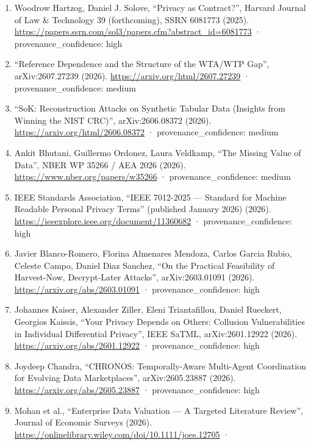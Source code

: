 \documentclass[
  11pt,
]{article}
\begin{document}
\begin{enumerate}
  notions for protection against reconstruction attacks in machine
  learning'', arXiv:2502.04045 (2025).
  \url{https://arxiv.org/abs/2502.04045} · provenance\_confidence: high
\item
  Woodrow Hartzog, Daniel J. Solove, ``Privacy as Contract?'', Harvard
  Journal of Law \& Technology 39 (forthcoming), SSRN 6081773 (2025).
  \url{https://papers.ssrn.com/sol3/papers.cfm?abstract_id=6081773} ·
  provenance\_confidence: high
\item
  ``Reference Dependence and the Structure of the WTA/WTP Gap'',
  arXiv:2607.27239 (2026). \url{https://arxiv.org/html/2607.27239} ·
  provenance\_confidence: medium
\item
  ``SoK: Reconstruction Attacks on Synthetic Tabular Data (Insights from
  Winning the NIST CRC)'', arXiv:2606.08372 (2026).
  \url{https://arxiv.org/html/2606.08372} · provenance\_confidence:
  medium
\item
  Ankit Bhutani, Guillermo Ordonez, Laura Veldkamp, ``The Missing Value
  of Data'', NBER WP 35266 / AEA 2026 (2026).
  \url{https://www.nber.org/papers/w35266} · provenance\_confidence:
  medium
\item
  IEEE Standards Association, ``IEEE 7012-2025 --- Standard for Machine
  Readable Personal Privacy Terms'' (published January 2026) (2026).
  \url{https://ieeexplore.ieee.org/document/11360682} ·
  provenance\_confidence: high
\item
  Javier Blanco-Romero, Florina Almenares Mendoza, Carlos Garcia Rubio,
  Celeste Campo, Daniel Diaz Sanchez, ``On the Practical Feasibility of
  Harvest-Now, Decrypt-Later Attacks'', arXiv:2603.01091 (2026).
  \url{https://arxiv.org/abs/2603.01091} · provenance\_confidence: high
\item
  Johannes Kaiser, Alexander Ziller, Eleni Triantafillou, Daniel
  Rueckert, Georgios Kaissis, ``Your Privacy Depends on Others:
  Collusion Vulnerabilities in Individual Differential Privacy'', IEEE
  SaTML, arXiv:2601.12922 (2026). \url{https://arxiv.org/abs/2601.12922}
  · provenance\_confidence: high
\item
  Joydeep Chandra, ``CHRONOS: Temporally-Aware Multi-Agent Coordination
  for Evolving Data Marketplaces'', arXiv:2605.23887 (2026).
  \url{https://arxiv.org/abs/2605.23887} · provenance\_confidence: high
\item
  Mohan et al., ``Enterprise Data Valuation --- A Targeted Literature
  Review'', Journal of Economic Surveys (2026).
  \url{https://onlinelibrary.wiley.com/doi/10.1111/joes.12705} ·

\end{enumerate}
\end{document}
